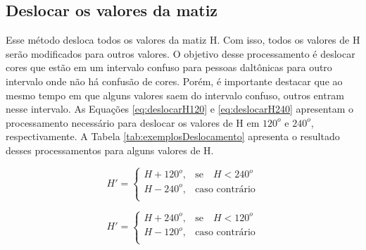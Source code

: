 \documentclass[	12pt, Times, openright, twoside, a4paper, english, brazil]{abntex2}
\begin{document}
\subsection{Deslocar os valores da matiz}
\label{subsec:deslocarMatiz}

Esse método desloca todos os valores da matiz H. Com isso, todos os valores de H serão modificados para outros valores. O objetivo desse processamento é deslocar cores que estão em um intervalo confuso para pessoas daltônicas para outro intervalo onde não há confusão de cores. Porém, é importante destacar que ao mesmo tempo em que alguns valores saem do intervalo confuso, outros entram nesse intervalo. As Equações \ref{eq:deslocarH120} e \ref{eq:deslocarH240} apresentam o processamento necessário para deslocar os valores de H em $120^o$ e $240^o$, respectivamente. A Tabela \ref{tab:exemplosDeslocamento} apresenta o resultado desses processamentos para alguns valores de H.

\begin{equation}
\label{eq:deslocarH120}
H'=\left\{
\begin{array}{rl}
       H + 120^o,   &\mbox{se}\quad  H < 240^o \\
       H - 240^o,   &\mbox{caso contrário} \\
\end{array}\right.
\end{equation}

\begin{equation}
\label{eq:deslocarH240}
H'=\left\{
\begin{array}{rl}
       H + 240^o,   &\mbox{se}\quad  H < 120^o \\
       H - 120^o,   &\mbox{caso contrário} \\
\end{array}\right.
\end{equation}
\end{document}
